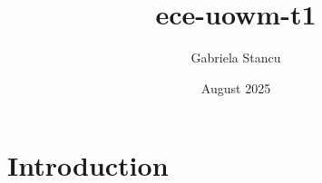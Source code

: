 \documentclass{article}
\title{ece-uowm-t1}
\author{Gabriela Stancu}
\date{August 2025}
\begin{document}
\maketitle

\section{Introduction}
\end{document}
